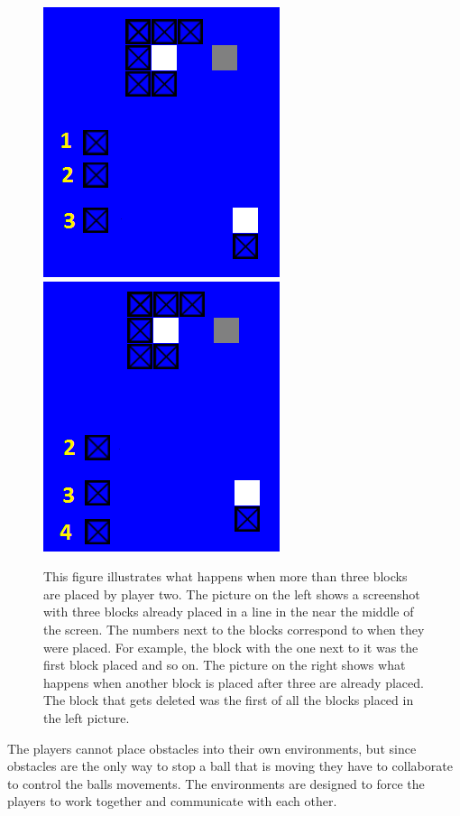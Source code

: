 \begin{figure}
\hspace*{\fill}\includegraphics[width=0.45\columnwidth]{blocksplaced1-cropped.png}
\hspace*{\fill}\includegraphics[width=0.45\columnwidth]{blocksplaced2-cropped.png}\hspace*{\fill}
\caption{
This figure illustrates what happens when more than three
blocks are placed by player two. The picture on the left shows a
screenshot with three blocks already placed in a line in the near the
middle of the screen. The numbers next to the blocks correspond to
when they were placed. For example, the block with the one next to it
was the first block placed and so on. The picture on the right shows
what happens when another block is placed after three are already
placed. The block that gets deleted was the first of all the blocks
placed in the left picture.}\label{fig:dropping-blocks}
\end{figure}

The players cannot place obstacles into their own environments, but
since obstacles are the only way to stop a ball that is moving they
have to collaborate to control the balls movements. 
The environments are designed to force the players to work together
and communicate with each other.

